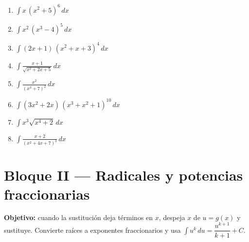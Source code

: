 \documentclass[12pt, letterpaper]{article}
\newcommand{\dx}{\,dx}
\newcommand{\du}{\,du}
\begin{document}
\begin{enumerate}[label=\textbf{\arabic*.}, leftmargin=*, itemsep=9pt]

  \item \medio\quad $\displaystyle\int x\,(x^{2}+5)^{6}\dx$

  \item \medio\quad $\displaystyle\int x^{2}\,(x^{3}-4)^{5}\dx$

  \item \medio\quad $\displaystyle\int (2x+1)\,(x^{2}+x+3)^{4}\dx$

  \item \medio\quad $\displaystyle\int \frac{x+1}{\sqrt{x^{2}+2x+5}}\dx$

  \item \medio\quad $\displaystyle\int \frac{x^{2}}{(x^{3}+7)^{2}}\dx$

  \item \medio\quad $\displaystyle\int (3x^{2}+2x)\,(x^{3}+x^{2}+1)^{10}\dx$

  \item \medio\quad $\displaystyle\int x^{3}\sqrt{x^{4}+2}\dx$

  \item \dificil\quad $\displaystyle\int \frac{x+2}{(x^{2}+4x+7)^{3}}\dx$

\end{enumerate}

\vspace{6pt}

\section{Bloque II — Radicales y potencias fraccionarias}

\begin{cuadroinfo}
\small
\textbf{Objetivo:} cuando la sustitución deja términos en $x$, despeja $x$ de
$u = g(x)$ y sustituye. Convierte raíces a exponentes fraccionarios y usa
$\int u^{k}\du = \dfrac{u^{k+1}}{k+1}+C$.
\end{cuadroinfo}

\vspace{4pt}
\end{document}
